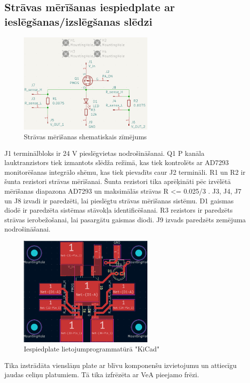 \subsection{Strāvas mērīšanas iespiedplate ar ieslēgšanas/izslēgšanas slēdzi}
\begin{figure}[H]
	\centering
    \includegraphics[width=0.6\textwidth]{pictures/shunt_resistors.png}\hspace{1cm}
    \caption{Strāvas mērīšanas shematiskais zīmējums}
\end{figure}
J1 terminālbloks ir 24 V pieslēgvietas nodrošināšanai. Q1 P kanāla lauktranzistors tiek izmantots slēdža režīmā, kas tiek kontrolēts ar AD7293 monitorēšanas integrālo shēmu, kas tiek pievadīts caur J2 termināli. R1 un R2 ir šunta rezistori strāvas mērīšanai. Šunta rezistori tika aprēķināti pēc izvēlētā mērīšanas diapazona AD7293 un maksimālās strāvas R <= 0.025/3 . J3, J4, J7 un J8 izvadi ir paredzēti, lai pieslēgtu strāvas mērīšanas sistēmu. D1 gaismas diodē ir paredzēta sistēmas stāvokļa identificēšanai. R3 rezistors ir paredzēts strāvas ierobežošanai, lai pasargātu gaismas diodi. J9 izvads paredzēts zemējuma nodrošināšanai.
\begin{figure}[H]
	\centering
    \includegraphics[width=0.6\textwidth]{pictures/shunt_resistors_board.png}\hspace{1cm}
    \caption{Iespiedplate lietojumprogrammatūrā "KiCad"}
\end{figure}
Tika izstrādāta vienslāņu plate ar blīvu komponenšu izvietojumu un attiecīgu jaudas celiņu platumiem. Tā tika izfrēzēta ar VeA pieejamo frēzi.
